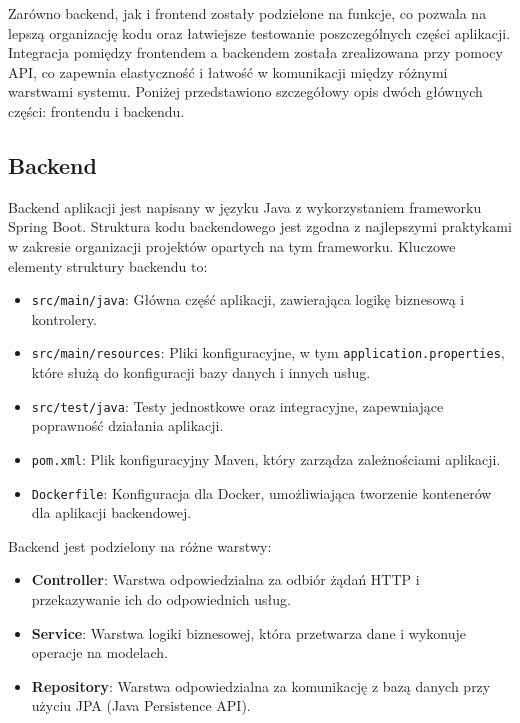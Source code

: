 Zarówno backend, jak i frontend zostały podzielone na funkcje, co pozwala na lepszą organizację kodu oraz łatwiejsze testowanie poszczególnych części aplikacji. Integracja pomiędzy frontendem a backendem została zrealizowana przy pomocy API, co zapewnia elastyczność i łatwość w komunikacji między różnymi warstwami systemu.
Poniżej przedstawiono szczegółowy opis dwóch głównych części: frontendu i backendu.

\subsection{Backend}
Backend aplikacji jest napisany w języku Java z wykorzystaniem frameworku Spring Boot. Struktura kodu backendowego jest zgodna z najlepszymi praktykami w zakresie organizacji projektów opartych na tym frameworku. Kluczowe elementy struktury backendu to:
\begin{itemize}
    \item \texttt{src/main/java}: Główna część aplikacji, zawierająca logikę biznesową i kontrolery.
    \item \texttt{src/main/resources}: Pliki konfiguracyjne, w tym \texttt{application.properties}, które służą do konfiguracji bazy danych i innych usług.
    \item \texttt{src/test/java}: Testy jednostkowe oraz integracyjne, zapewniające poprawność działania aplikacji.
    \item \texttt{pom.xml}: Plik konfiguracyjny Maven, który zarządza zależnościami aplikacji.
    \item \texttt{Dockerfile}: Konfiguracja dla Docker, umożliwiająca tworzenie kontenerów dla aplikacji backendowej.
\end{itemize}

Backend jest podzielony na różne warstwy:
\begin{itemize}
    \item \textbf{Controller}: Warstwa odpowiedzialna za odbiór żądań HTTP i przekazywanie ich do odpowiednich usług.
    \item \textbf{Service}: Warstwa logiki biznesowej, która przetwarza dane i wykonuje operacje na modelach.
    \item \textbf{Repository}: Warstwa odpowiedzialna za komunikację z bazą danych przy użyciu JPA (Java Persistence API).
\end{itemize}

